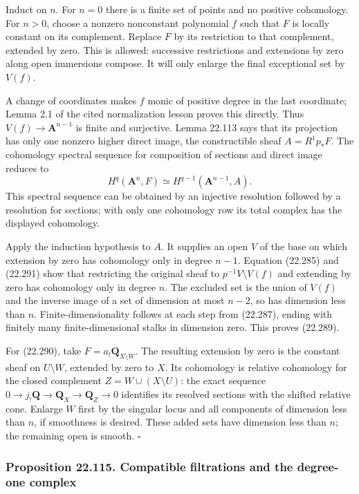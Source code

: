 \documentclass[
  11pt,
  a4paper,
]{article}
\begin{document}
Induct on \(n\). For \(n=0\) there is a finite set of points and no
positive cohomology. For \(n>0\), choose a nonzero nonconstant
polynomial \(f\) such that \(F\) is locally constant on its complement.
Replace \(F\) by its restriction to that complement, extended by zero.
This is allowed: successive restrictions and extensions by zero along
open immersions compose. It will only enlarge the final exceptional set
by \(V(f)\).

A change of coordinates makes \(f\) monic of positive degree in the last
coordinate; Lemma 2.1 of the cited normalization lesson proves this
directly. Thus \(V(f)\to\mathbf A^{n-1}\) is finite and surjective.
Lemma 22.113 says that its projection has only one nonzero higher direct
image, the constructible sheaf \(A=R^1p_*F\). The cohomology spectral
sequence for composition of sections and direct image reduces to \[
 H^q(\mathbf A^n,F)\simeq H^{q-1}(\mathbf A^{n-1},A).
 \tag{22.291}
\] This spectral sequence can be obtained by an injective resolution
followed by a resolution for sections; with only one cohomology row its
total complex has the displayed cohomology.

Apply the induction hypothesis to \(A\). It supplies an open \(V\) of
the base on which extension by zero has cohomology only in degree
\(n-1\). Equation (22.285) and (22.291) show that restricting the
original sheaf to \(p^{-1}V\setminus V(f)\) and extending by zero has
cohomology only in degree \(n\). The excluded set is the union of
\(V(f)\) and the inverse image of a set of dimension at most \(n-2\), so
has dimension less than \(n\). Finite-dimensionality follows at each
step from (22.287), ending with finitely many finite-dimensional stalks
in dimension zero. This proves (22.289).

For (22.290), take \(F=a_!\mathbf Q_{X\setminus W}\). The resulting
extension by zero is the constant sheaf on \(U\setminus W\), extended by
zero to \(X\). Its cohomology is relative cohomology for the closed
complement \(Z=W\cup(X\setminus U)\): the exact sequence
\(0\to j_!\mathbf Q\to\mathbf Q_X\to\mathbf Q_Z\to0\) identifies its
resolved sections with the shifted relative cone. Enlarge \(W\) first by
the singular locus and all components of dimension less than \(n\), if
smoothness is desired. These added sets have dimension less than \(n\);
the remaining open is smooth. \(\square\)

\subsubsection{Proposition 22.115. Compatible filtrations and the
degree-one
complex}\label{proposition-22.115.-compatible-filtrations-and-the-degree-one-complex}
\end{document}
